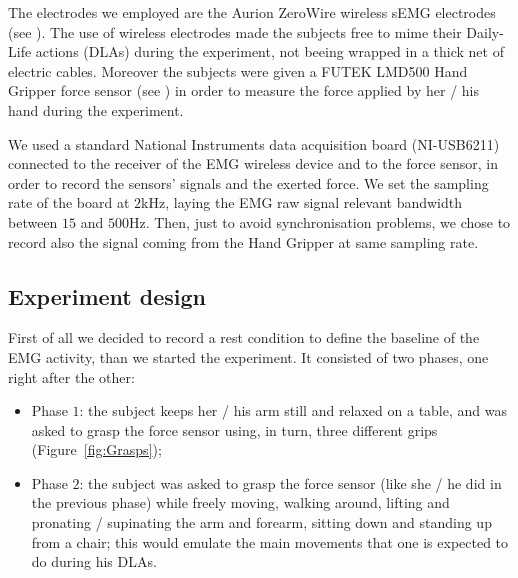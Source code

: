 The electrodes we employed are the Aurion ZeroWire wireless sEMG electrodes (see \cite{zerowire}). The use of wireless electrodes made the subjects free to mime their Daily-Life actions (DLAs) during the experiment, not beeing wrapped in a thick net of electric cables. Moreover the subjects were given a FUTEK LMD500 Hand Gripper force sensor (see \cite{LMD500}) in order to measure the force applied by her / his hand during the experiment.


We used a standard National Instruments data acquisition board (NI-USB6211) connected to the receiver of the EMG wireless device and to the force sensor, in order to record the sensors' signals and the exerted force. We set the sampling rate of the board at $2$kHz, laying the EMG raw signal relevant bandwidth between $15$ and $500$Hz. Then, just to avoid synchronisation problems, we chose to record also the signal coming from the Hand Gripper at same sampling rate.


\subsection{Experiment design}

First of all we decided to record a rest condition to define the baseline of the EMG activity, than we started the experiment. It consisted of two phases, one right after the other:

\begin{itemize}
	\item Phase $1$: the subject keeps her / his arm still and relaxed on a table, and was asked to grasp the force sensor using, in turn, three different grips (Figure~\ref{fig:Grasps});
	\item Phase $2$: the subject was asked to grasp the force sensor (like she / he did in the previous phase) while freely moving, walking around, lifting and pronating / supinating the arm and forearm, sitting down and standing up from a chair; this would emulate the main movements that one is expected to do during his DLAs.
\end{itemize}

